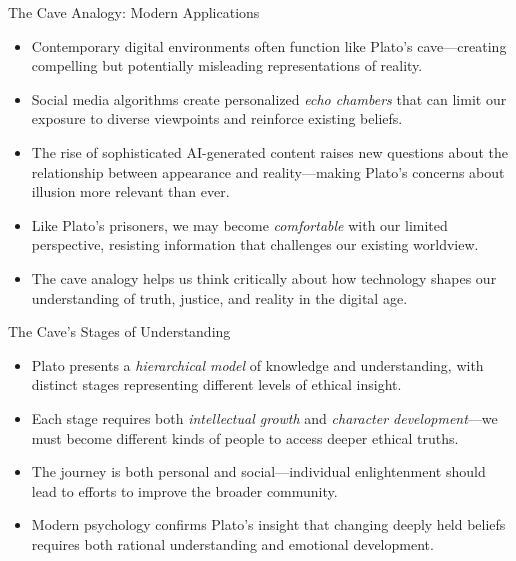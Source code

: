 \documentclass[aspectratio=169]{beamer}
\begin{document}
\begin{frame}{The Cave Analogy: Modern Applications}
\begin{itemize}
\item Contemporary digital environments often function like Plato's cave—creating compelling but potentially misleading representations of reality.
\item Social media algorithms create personalized \emph{echo chambers} that can limit our exposure to diverse viewpoints and reinforce existing beliefs.
\item The rise of sophisticated AI-generated content raises new questions about the relationship between appearance and reality—making Plato's concerns about illusion more relevant than ever.
\item Like Plato's prisoners, we may become \emph{comfortable} with our limited perspective, resisting information that challenges our existing worldview.
\item The cave analogy helps us think critically about how technology shapes our understanding of truth, justice, and reality in the digital age.
\end{itemize}
\end{frame}

\begin{frame}{The Cave's Stages of Understanding}
\begin{itemize}
\item Plato presents a \emph{hierarchical model} of knowledge and understanding, with distinct stages representing different levels of ethical insight.
\item Each stage requires both \emph{intellectual growth} and \emph{character development}—we must become different kinds of people to access deeper ethical truths.
\item The journey is both personal and social—individual enlightenment should lead to efforts to improve the broader community.
\item Modern psychology confirms Plato's insight that changing deeply held beliefs requires both rational understanding and emotional development.
\end{itemize}
\end{frame}
\end{document}
